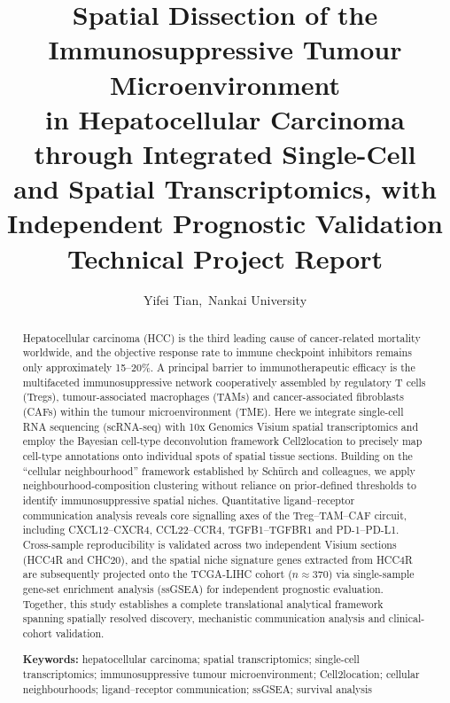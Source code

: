 \documentclass[12pt, a4paper]{article}
\title{
    \vspace{-1cm}
    \textbf{Spatial Dissection of the Immunosuppressive Tumour Microenvironment\\
    in Hepatocellular Carcinoma through Integrated Single-Cell\\
    and Spatial Transcriptomics, with Independent Prognostic Validation}\\[0.5em]
    \large Technical Project Report
}
\author{Yifei Tian,\ Nankai University}
\date{}
\begin{document}
\maketitle
\thispagestyle{empty}

\begin{abstract}
Hepatocellular carcinoma (HCC) is the third leading cause of cancer-related mortality worldwide, and the objective response rate to immune checkpoint inhibitors remains only approximately 15--20\%. A principal barrier to immunotherapeutic efficacy is the multifaceted immunosuppressive network cooperatively assembled by regulatory T cells (Tregs), tumour-associated macrophages (TAMs) and cancer-associated fibroblasts (CAFs) within the tumour microenvironment (TME). Here we integrate single-cell RNA sequencing (scRNA-seq) with 10x Genomics Visium spatial transcriptomics and employ the Bayesian cell-type deconvolution framework Cell2location to precisely map cell-type annotations onto individual spots of spatial tissue sections. Building on the ``cellular neighbourhood'' framework established by Schürch and colleagues, we apply neighbourhood-composition clustering without reliance on prior-defined thresholds to identify immunosuppressive spatial niches. Quantitative ligand--receptor communication analysis reveals core signalling axes of the Treg--TAM--CAF circuit, including CXCL12--CXCR4, CCL22--CCR4, TGFB1--TGFBR1 and PD-1--PD-L1. Cross-sample reproducibility is validated across two independent Visium sections (HCC4R and CHC20), and the spatial niche signature genes extracted from HCC4R are subsequently projected onto the TCGA-LIHC cohort ($n \approx 370$) via single-sample gene-set enrichment analysis (ssGSEA) for independent prognostic evaluation. Together, this study establishes a complete translational analytical framework spanning spatially resolved discovery, mechanistic communication analysis and clinical-cohort validation.

\noindent\textbf{Keywords:}
hepatocellular carcinoma; spatial transcriptomics; single-cell transcriptomics; immunosuppressive tumour microenvironment; Cell2location;
cellular neighbourhoods; ligand--receptor communication; ssGSEA; survival analysis
\end{abstract}

\newpage
\tableofcontents
\newpage

\end{document}
